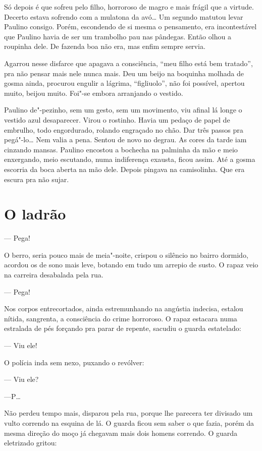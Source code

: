 Só depois é que sofreu pelo filho, horroroso de magro e mais frágil que
a virtude. Decerto estava sofrendo com a mulatona da avó\ldots{} Um segundo
matutou levar Paulino consigo. Porém, escondendo de si mesma o
pensamento, era incontestável que Paulino havia de ser um trambolho pau
nas pândegas. Então olhou a roupinha dele. De fazenda boa não era, mas
enfim sempre servia. 

Agarrou nesse disfarce que apagava a consciência, ``meu filho está bem
tratado'', pra não pensar mais nele nunca mais. Deu um beijo na boquinha
molhada de gosma ainda, procurou engulir a lágrima, ``figliuolo'', não
foi possível, apertou muito, beijou muito. Foi"-se embora arranjando o
vestido.

Paulino de"-pezinho, sem um gesto, sem um movimento, viu afinal lá longe
o vestido azul desaparecer. Virou o rostinho. Havia um pedaço de papel
de embrulho, todo engordurado, rolando engraçado no chão. Dar três
passos pra pegá"-lo\ldots{} Nem valia a pena. Sentou de novo no degrau. As
cores da tarde iam cinzando mansas. Paulino encostou a bochecha na
palminha da mão e meio enxergando, meio escutando, numa indiferença
exausta, ficou assim. Até a gosma escorria da boca aberta na mão dele.
Depois pingava na camisolinha. Que era escura pra não sujar.

\chapter{O ladrão}

--- Pega!

O berro, seria pouco mais de meia"-noite, crispou o silêncio no bairro
dormido, acordou os de sono mais leve, botando em tudo um arrepio de
susto. O rapaz veio na carreira desabalada pela rua.

--- Pega!

Nos corpos entrecortados, ainda estremunhando na angústia indecisa,
estalou nítida, sangrenta, a consciência do crime horroroso. O rapaz
estacara numa estralada de pés forçando pra parar de repente, sacudiu o
guarda estatelado:

--- Viu ele!

O polícia inda sem nexo, puxando o revólver:

--- Viu ele?

---P\ldots{}

Não perdeu tempo mais, disparou pela rua, porque lhe parecera ter
divisado um vulto correndo na esquina de lá. O guarda ficou sem saber o
que fazia, porém da mesma direção do moço já chegavam mais dois homens
correndo. O guarda eletrizado gritou:

